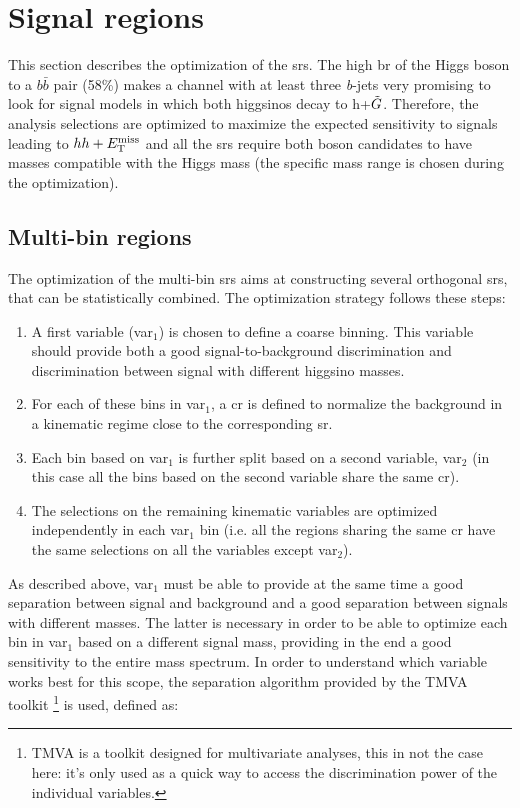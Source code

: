 \FloatBarrier

\section{Signal regions}
\label{sec:ewk:SR}

This section describes the optimization of the \glspl{sr}. 
The high \gls{br} of the Higgs boson to a $b\bar{b}$ pair (58\%) makes a channel with at least three \textit{b}-jets very 
promising to look for signal models 
in which both higgsinos decay to h+$\tilde{G}$. 
Therefore, the analysis selections are optimized to maximize the expected sensitivity to signals leading to $hh+E_{\rm T}^{\mathrm{miss}}$ 
and all the \glspl{sr} require both boson candidates to have masses compatible with the Higgs mass (the specific mass range is chosen during the optimization). 

\subsection{Multi-bin regions}
\label{sec:ewk:multibin}

The optimization of the multi-bin \glspl{sr} aims at constructing several orthogonal \glspl{sr}, that can be statistically combined. 
The optimization strategy follows these steps:
\begin{enumerate}
\item A first variable (var$_1$) is chosen to define a coarse binning. 
    This variable should provide both a good signal-to-background discrimination and discrimination between signal 
    with different higgsino masses.
\item For each of these bins in var$_1$, a \gls{cr} is defined to normalize the \ttbar background in a kinematic regime close to the corresponding \gls{sr}.
\item Each bin based on var$_1$ is further split based on a second variable, var$_2$ (in this case all the bins based on the second variable share the same \gls{cr}).
\item The selections on the remaining kinematic variables are optimized independently in each var$_1$ bin (i.e. all the regions sharing the same 
\gls{cr} have the same selections on all the variables except var$_2$).
\end{enumerate}

\noindent As described above, var$_1$ must be able to provide at the same time a good separation between signal and background 
and a good separation between signals with different \hino masses. 
The latter is necessary in order to be able to optimize each bin in var$_1$ based on a different signal mass, 
providing in the end a good sensitivity to the entire mass spectrum. 
In order to understand which variable works best for this scope, the separation algorithm provided by the TMVA toolkit \footnote{TMVA is a toolkit designed for multivariate analyses, this in not the case here: it's only used as a quick way to access the discrimination power of the individual variables.} \cite{Hocker:2007ht} is used, defined as:

